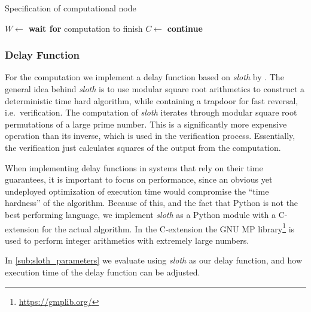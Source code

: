 \begin{algorithm}[tb]
\caption{Specification of computational node}
\label{lst:comp_node}
\begin{algorithmic}[1]
    \State {}
\EndProcedure
{}
    \Repeat
        \State {}
            \State $W \gets $  
                \State {}
                \State {}
                \State {}
                \State \textbf{wait for} computation to finish
                \State $C \gets $ 
                \State {}
            \Else
                \State {}
            \EndIf
        \Else
            \State \textbf{continue}
        \EndIf
\EndProcedure
\end{algorithmic}
\end{algorithm}

\subsubsection{Delay Function}%
\label{ssub:delay_function}
For the computation we implement a delay function based on \textit{sloth} by \citet{randomzoo}.
The general idea behind \textit{sloth} is to use modular square root arithmetics to construct a deterministic time hard algorithm, while containing a trapdoor for fast reversal, i.e.\ verification.
The computation of \textit{sloth} iterates through modular square root permutations of a large prime number.
This is a significantly more expensive operation than its inverse, which is used in the verification process.
Essentially, the verification just calculates squares of the output from the computation.

When implementing delay functions in systems that rely on their time guarantees, it is important to focus on performance, since an obvious yet undeployed optimization of execution time would compromise the \enquote{time hardness} of the algorithm.
Because of this, and the fact that Python is not the best performing language, we implement \textit{sloth} as a Python module with a C-extension for the actual algorithm.
In the C-extension the GNU MP library\footnote{\url{https://gmplib.org/}} is used to perform integer arithmetics with extremely large numbers.

In \vref{sub:sloth_parameters} we evaluate using \textit{sloth} as our delay function, and how execution time of the delay function can be adjusted.

